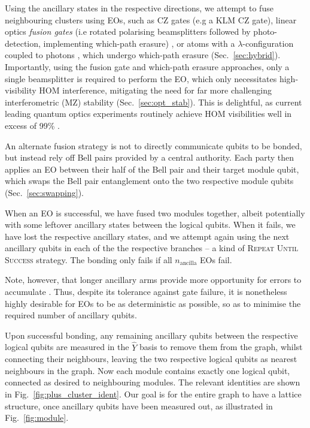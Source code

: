 Using the ancillary states in the respective directions, we attempt to fuse neighbouring clusters using EOs, such as CZ gates (e.g a KLM CZ gate), linear optics \textit{fusion gates} (i.e rotated polarising beamsplitters followed by photo-detection, implementing which-path erasure) \cite{bib:BrowneRudolph05}, or atoms with a $\lambda$-configuration coupled to photons \cite{bib:BarrettKok05}, which undergo which-path erasure (Sec.~\ref{sec:hybrid}). Importantly, using the fusion gate and which-path erasure approaches, only a single beamsplitter is required to perform the EO, which only necessitates high-visibility HOM interference, mitigating the need for far more challenging interferometric (MZ) stability (Sec.~\ref{sec:opt_stab}). This is delightful, as current leading quantum optics experiments routinely achieve HOM visibilities well in excess of 99\% \cite{???}.

An alternate fusion strategy is not to directly communicate qubits to be bonded, but instead rely off Bell pairs provided by a central authority. Each party then applies an EO between their half of the Bell pair and their target module qubit, which swaps the Bell pair entanglement onto the two respective module qubits (Sec.~\ref{sec:swapping}).

When an EO is successful, we have fused two modules together, albeit potentially with some leftover ancillary states between the logical qubits. When it fails, we have lost the respective ancillary states, and we attempt again using the next ancillary qubits in each of the the respective branches -- a kind of \textsc{Repeat Until Success} strategy. The bonding only fails if all $n_\mathrm{ancilla}$ EOs fail.

Note, however, that longer ancillary arms provide more opportunity for errors to accumulate \cite{bib:RohdeRalphMunro07}. Thus, despite its tolerance against gate failure, it is nonetheless highly desirable for EOs to be as deterministic as possible, so as to minimise the required number of ancillary qubits.

Upon successful bonding, any remaining ancillary qubits between the respective logical qubits are measured in the $\hat{Y}$ basis to remove them from the graph, whilst connecting their neighbours, leaving the two respective logical qubits as nearest neighbours in the graph. Now each module contains exactly one logical qubit, connected as desired to neighbouring modules. The relevant identities are shown in Fig.~\ref{fig:plus_cluster_ident}. Our goal is for the entire graph to have a lattice structure, once ancillary qubits have been measured out, as illustrated in Fig.~\ref{fig:module}.

